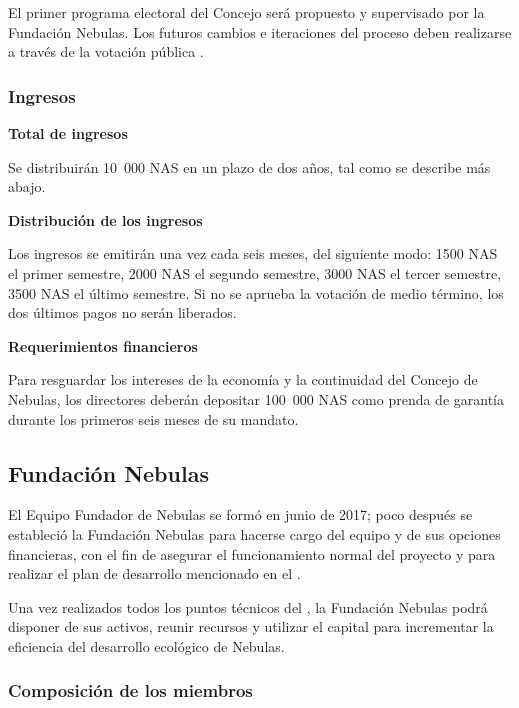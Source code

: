 El primer programa electoral del Concejo será propuesto y supervisado por la Fundación Nebulas. Los futuros cambios e iteraciones del proceso deben realizarse a través de la votación pública \onchain.

\subsubsection{Ingresos}

\textbf{Total de ingresos}

Se distribuirán 10 000 NAS en un plazo de dos años, tal como se describe más abajo.

\vspace{2em}

\textbf{Distribución de los ingresos}

Los ingresos se emitirán una vez cada seis meses, del siguiente modo: 1500 NAS el primer semestre, 2000 NAS el segundo semestre, 3000 NAS el tercer semestre, 3500 NAS el último semestre. Si no se aprueba la votación de medio término, los dos últimos pagos no serán liberados.

\vspace{2em}

\textbf{Requerimientos financieros}

Para resguardar los intereses de la economía y la continuidad del Concejo de Nebulas, los directores deberán depositar 100 000 NAS como prenda de garantía durante los primeros seis meses de su mandato.

\vspace{2em}

\subsection{Fundación Nebulas}

El Equipo Fundador de Nebulas se formó en junio de 2017; poco después se estableció la Fundación Nebulas para hacerse cargo del equipo y de sus opciones financieras, con el fin de asegurar el funcionamiento normal del proyecto y para realizar el plan de desarrollo mencionado en el \ntechw.

Una vez realizados todos los puntos técnicos del \ntechw, la Fundación Nebulas podrá disponer de sus activos, reunir recursos y utilizar el capital para incrementar la eficiencia del desarrollo ecológico de Nebulas.

\subsubsection{Composición de los miembros}

